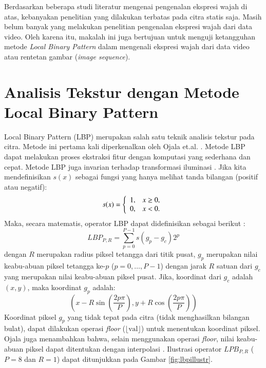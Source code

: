 \documentclass[review,3p,12pt,times]{elsarticle}
\begin{document}
Berdasarkan beberapa studi literatur mengenai pengenalan ekspresi wajah di atas, kebanyakan penelitian yang dilakukan terbatas pada citra statis saja. Masih belum banyak yang melakukan penelitian pengenalan ekspresi wajah dari data video. Oleh karena itu, makalah ini juga bertujuan untuk menguji ketangguhan metode \textit{Local Binary Pattern} dalam mengenali ekspresi wajah dari data video atau rentetan gambar (\textit{image sequence}).



\section{Analisis Tekstur dengan Metode Local Binary Pattern}
\label{lbp}

Local Binary Pattern (LBP) merupakan salah satu teknik analisis tekstur pada citra. Metode ini pertama kali diperkenalkan oleh Ojala et.al. \cite{ojala1996comparative}. Metode LBP dapat melakukan proses ekstraksi fitur dengan komputasi yang sederhana dan cepat. Metode LBP juga invarian terhadap transformasi iluminasi \cite{ojala2002multiresolution}. Jika kita mendefinisikan $s(x)$ sebagai fungsi yang hanya melihat tanda bilangan (positif atau negatif):
\begin{equation}
s(x) = \left\{
	\begin{array}{l l}
		1,& x \geq 0, \\
		0,& x < 0.
	\end{array}
	\right.
\end{equation}
Maka, secara matematis, operator LBP dapat didefinisikan sebagai berikut \cite{ojala2002multiresolution}:
\begin{equation}
LBP_{P,R} = \sum_{p=0}^{P-1} s(g_p - g_c) 2^p
\end{equation}
dengan $R$ merupakan radius piksel tetangga dari titik pusat, $g_p$ merupakan nilai keabu-abuan piksel tetangga ke-$p$ ($p = 0,\dots,P-1$) dengan jarak $R$ satuan dari $g_c$ yang merupakan nilai keabu-abuan piksel pusat. Jika, koordinat dari $g_c$ adalah $(x,y)$, maka koordinat $g_p$ adalah:
\begin{equation}
(x-R\sin(\frac{2p\pi}{P}), y+R\cos(\frac{2p\pi}{P}))
\end{equation}
Koordinat piksel $g_p$ yang tidak tepat pada citra (tidak menghasilkan bilangan bulat), dapat dilakukan operasi \textit{floor} ($\lfloor {\text{val}} \rfloor$) untuk menentukan koordinat piksel. Ojala juga menambahkan bahwa, selain menggunakan operasi \textit{floor}, nilai keabu-abuan piksel dapat ditentukan dengan interpolasi \cite{ojala2002multiresolution}. Ilustrasi operator $LPB_{P,R}$ ($P=8$ dan $R=1$) dapat ditunjukkan pada Gambar \ref{fig:lbpillustr}. 
\end{document}
